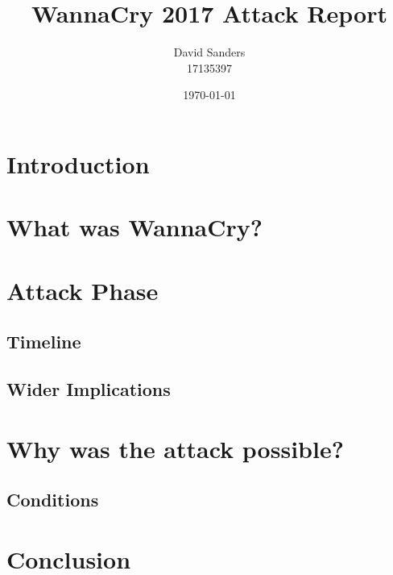 \documentclass[12pt]{article}
\title{WannaCry 2017 Attack Report}
\author{David Sanders\\17135397}
\date{\today}
\begin{document}
\maketitle


\section{Introduction}

\section{What was WannaCry?}

\section{Attack Phase}
\subsection{Timeline}
\subsection{Wider Implications}

\section{Why was the attack possible?}
\subsection{Conditions}

\section{Conclusion}

\pagebreak

\end{document}
